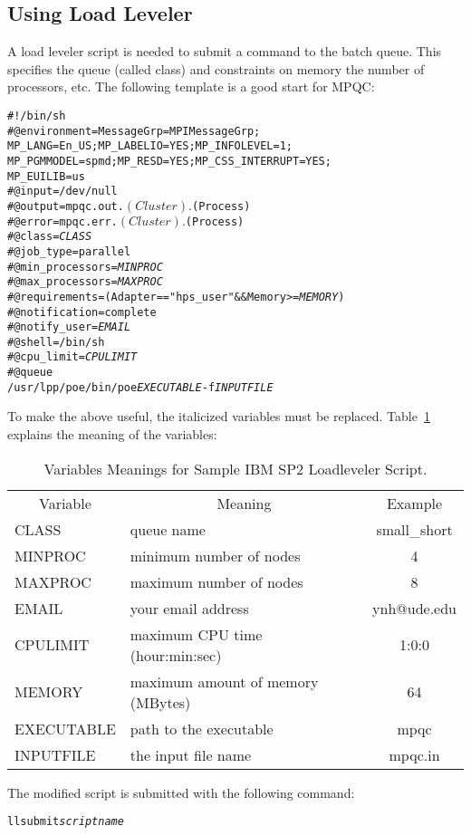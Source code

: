 \subsection{Using Load Leveler}

A load leveler script is needed to submit a command to the batch queue.
This specifies the queue (called class) and constraints on memory the
number of processors, etc.  The following template is a good start for
MPQC:

\begin{alltt}
#!/bin/sh
#@ environment = MessageGrp=MPIMessageGrp;\\
   MP_LANG=En_US;MP_LABELIO=YES;MP_INFOLEVEL=1;\\
   MP_PGMMODEL=spmd;MP_RESD=YES;MP_CSS_INTERRUPT=YES;\\
   MP_EUILIB=us
#@ input = /dev/null
#@ output = mpqc.out.$(Cluster).$(Process)
#@ error = mpqc.err.$(Cluster).$(Process)
#@ class = {\itshape CLASS}
#@ job_type = parallel
#@ min_processors = {\itshape MINPROC}
#@ max_processors = {\itshape MAXPROC}
#@ requirements =  (Adapter == "hps_user" && Memory >= {\itshape MEMORY})
#@ notification = complete
#@ notify_user = {\itshape EMAIL}
#@ shell = /bin/sh
#@ cpu_limit = {\itshape CPULIMIT}
#@ queue
/usr/lpp/poe/bin/poe {\itshape EXECUTABLE} -f {\itshape INPUTFILE}
\end{alltt}

To make the above useful, the italicized variables must be replaced.
Table~\ref{running:spvariables} explains the meaning of the variables:

\begin{table}
\caption{Variables Meanings for Sample IBM SP2 Loadleveler Script.}
\begin{center}
\begin{tabular}{lp{2.5in}c}
  \multicolumn{1}{c}{Variable}
     & \multicolumn{1}{c}{Meaning}
     & \multicolumn{1}{c}{Example} \\
  CLASS & queue name & small\_short \\
  MINPROC & minimum number of nodes & 4 \\
  MAXPROC & maximum number of nodes & 8 \\
  EMAIL & your email address & ynh@ude.edu \\
  CPULIMIT & maximum CPU time (hour:min:sec) & 1:0:0 \\
  MEMORY & maximum amount of memory (MBytes) & 64 \\
  EXECUTABLE & path to the executable & mpqc \\
  INPUTFILE & the input file name & mpqc.in \\
\end{tabular}
\end{center}
\label{running:spvariables}
\end{table}

The modified script is submitted with the following command:

\begin{alltt}
llsubmit {\itshape scriptname}
\end{alltt}

